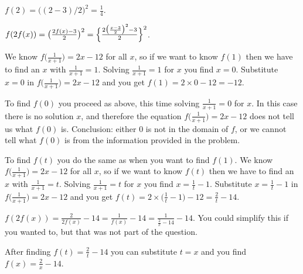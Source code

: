 $f(2) = \bigl((2-3)/2\bigr)^2 = \frac{1}{4}$.
\bigskip

\item[{\bfseries(I7.14g)}]

$f(2f(x)) = \bigl(\frac{2f(x)-3}{2}\bigr)^2 =
\Bigl\{\frac{2\bigl(\frac{x-3}{2}\bigr)^2 - 3}{2}\Bigr\}^2$.



\bigskip

\item[{\bfseries(I7.15a)}]

We know $f\bigl(\frac1{x+1}\bigr) = 2x-12$ for all $x$, so if we want to know
$f(1)$ then we have to find an $x$ with $\frac{1}{x+1} = 1$.  Solving $\frac{1}{x+1} = 1$
for $x$ you find $x=0$. Substitute $x=0$ in $f\bigl(\frac1{x+1}\bigr) = 2x-12$
and you get $f(1) = 2\times0-12 = -12$.
\bigskip

\item[{\bfseries(I7.15b)}]

To find $f(0)$ you proceed as above, this time solving $\frac{1}{x+1} = 0$ for
$x$.  In this case there is no solution $x$, and therefore the equation
$f\bigl(\frac1{x+1}\bigr) = 2x-12$ does not tell us what $f(0)$ is.  Conclusion:
either 0 is not in the domain of $f$, or we cannot tell what $f(0)$ is from
the  information provided in the problem.
\bigskip

\item[{\bfseries(I7.15c)}]

To find $f(t)$ you do the same as when you want to find $f(1)$.
We know $f\bigl(\frac1{x+1}\bigr) = 2x-12$ for all $x$, so if we want to know
$f(t)$ then we have to find an $x$ with $\frac{1}{x+1} = t$.  Solving $\frac{1}{x+1} = t$
for $x$ you find $x=\frac 1t -1$. Substitute $x=\frac 1t -1$ in $f\bigl(\frac1{x+1}\bigr) = 2x-12$
and you get $f(t) = 2\times\bigl(\frac{1}{t}-1\bigr)-12 = \frac{2}{t} -14 $.
\bigskip

\item[{\bfseries(I7.15d)}]

$f(2f(x)) = \frac{2}{2f(x)} - 14 = \frac{1}{f(x)} - 14 =
\frac{1}{\frac{2}{x}-14} - 14$.  You could simplify this if you wanted to, but
that was not part of the question.
\bigskip

\item[{\bfseries(I7.15e)}]

After finding $f(t) = \frac{2}{t} -14 $ you can substitute $t=x$ and you find
$f(x) = \frac{2}{x} -14 $.
\bigskip

\item[{\bfseries(I7.15f)}]

